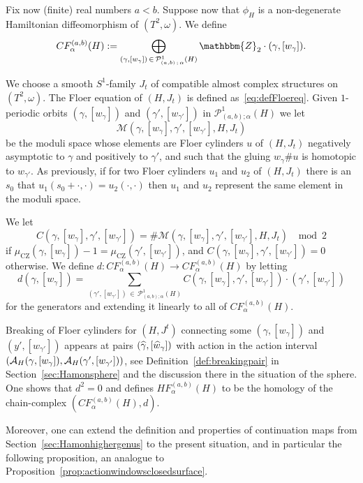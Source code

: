 \documentclass[AHL,Unicode,longabstracts,published]{cedram}
\newcommand{\Z}{\mathbbm{Z}}
\newcommand{\rCZ}{\mathrm{CZ}}
\newcommand{\clP}{\mathcal{P}}
\newcommand{\clA}{\mathcal{A}}
\newcommand{\clM}{\mathcal{M}}
\let\oldhat\hat
\renewcommand*{\hat}[1]{\mathchoice{\widehat{#1}}{\widehat{#1}}{\oldhat{#1}}{\oldhat{#1}}}
\begin{document}
Fix now (finite) real numbers $a<b$. Suppose now that $\phi_H$ is a non-degenerate Hamiltonian diffeomorphism of $(T^2,\omega)$.
We define
\[
CF_\alpha^{(a,b)}(H):= \bigoplus_{(\gamma, [w_\gamma])\,\in\,\clP^1_{(a,b)\,;\,\alpha}(H)}\Z_2 \cdot (\gamma, [w_\gamma]).
\]

We choose a smooth $S^1$-family $J_t$ of compatible almost complex structures on $(T^2,\omega)$. The Floer equation of $(H,J_t)$ is defined as~\eqref{eq:defFloereq}. Given $1$-periodic orbits $(\gamma, [w_\gamma])$ and $(\gamma', [w_{\gamma'}])$ in $\clP^1_{(a,b);\alpha}(H)$ we let
\[
\clM\left(\gamma, [w_\gamma],\gamma', [w_{\gamma'}],H,J_t\right)
\]
be the moduli space whose elements are Floer cylinders $u$ of $(H,J_t)$ negatively asymptotic to $\gamma$ and positively to $\gamma'$, and such that the gluing $w_\gamma \# u$ is homotopic to $w_{\gamma'}$. As previously, if for two Floer cylinders $u_1$ and $u_2$ of $(H,J_t)$ there is an $s_0$ that $u_1(s_0 + \cdot,\cdot)=u_2(\cdot,\cdot)$ then $u_1$ and $u_2$ represent the same element in the moduli space.

We let
\[
C\left(\gamma, [w_\gamma], \gamma', [w_{\gamma'}]\right) = \#\clM\left(\gamma, [w_\gamma], \gamma', [w_{\gamma'}], H, J_t\right)\, \, \mod 2
\]
if $\mu_{\rCZ}(\gamma, [w_\gamma]) -1 = \mu_{\rCZ}(\gamma', [w_{\gamma'}])$, and $C(\gamma, [w_\gamma], \gamma', [w_{\gamma'}]) = 0$ otherwise. We define $d:CF_\alpha^{(a,b)}(H) \to CF_\alpha^{(a,b)}(H)$ by letting
\[
d(\gamma, [w_\gamma]) =
\sum_{\left(\gamma', [w_{\gamma'}]\right)\, \in\,\clP^1_{(a,b);\alpha}(H)} C\left(\gamma,[w_\gamma],\gamma', [w_{\gamma'}]\right) \cdot \left(\gamma', [w_{\gamma'}]\right)
\]
for the generators and extending it linearly to all of $CF^{(a,b)}_\alpha(H)$.

Breaking of Floer cylinders for $(H,J^t)$ connecting some $(\gamma,[w_\gamma])$ and  $(y',[w_{\gamma'}])$ \linebreak appears at pairs $(\hat{\gamma}, [\hat{w}_\gamma])$ with action in the action interval $(\clA_H({\gamma}, [w_\gamma]),\linebreak \clA_H({\gamma'}, [{w}_{\gamma'}]))$, see Definition~\ref{def:breakingpair} in Section~\ref{sec:Hamonsphere} and the discussion there in the situation of the sphere. One shows that $d^2 = 0$ and defines $HF_\alpha^{(a,b)}(H)$ to be the homology of the chain-complex $(CF^{(a,b)}_\alpha(H),d)$.

Moreover, one can extend the definition and properties of continuation maps from Section~\ref{sec:Hamonhighergenus} to the present situation, and in particular the following proposition, an analogue to Proposition~\ref{prop:actionwindowsclosedsurface}.
\end{document}
